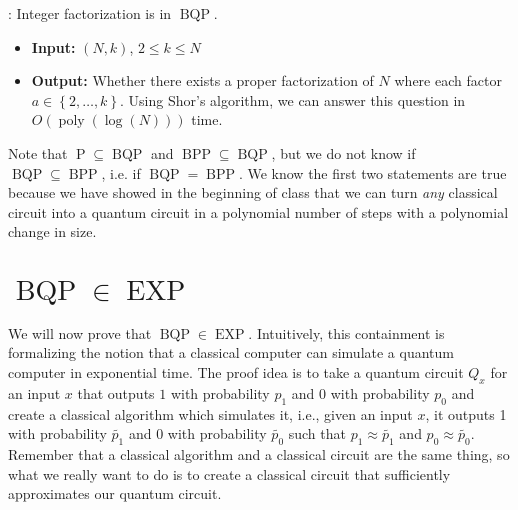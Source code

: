 \documentclass[11pt]{article}
\newcommand{\set}[1]{\left\{ #1 \right\}}
\newcommand{\poly}{\operatorname{poly}}
\newcommand{\bqp}{\operatorname{BQP}}
\newcommand{\bpp}{\operatorname{BPP}}
\newcommand{\p}{\operatorname{P}}
\renewcommand{\exp}{\operatorname{EXP}}
\newcommand{\Example}[1]{{\bf Example #1}:}
\def\fill{   \hfill}
\begin{document}
\fill

\noindent \Example{1} Integer factorization is in $\bqp$.
\begin{itemize}
\item {\bf Input:} $(N, k)$, $2 \leq k \leq N$
\item {\bf Output:} Whether there exists a proper factorization of $N$ where each factor $a \in \set{2, \dots, k}$. Using Shor's algorithm, we can answer this question in $O(\poly(\log(N)))$ time.
\end{itemize}

\fill

\noindent Note that $\p \subseteq \bqp$ and $\bpp \subseteq \bqp$, but we do not know if $\bqp \subseteq \bpp$, i.e. if $\bqp = \bpp$. We know the first two statements are true because we have showed in the beginning of class that we can turn \emph{any} classical circuit into a quantum circuit in a polynomial number of steps with a polynomial change in size. 

\section{$\bqp \in \exp$}
We will now prove that $\bqp \in \exp$. Intuitively, this containment is formalizing the notion that a classical computer can simulate a quantum computer in exponential time. The proof idea is to take a quantum circuit $Q_x$ for an input $x$ that outputs $1$ with probability $p_1$ and $0$ with probability $p_0$ and create a classical algorithm which simulates it, i.e., given an input $x$, it outputs 1 with probability $\widetilde{p_1}$ and 0 with probability $\widetilde{p_0}$ such that $p_1 \approx \widetilde{p_1}$ and $p_0 \approx \widetilde{p_0}$. Remember that a classical algorithm and a classical circuit are the same thing, so what we really want to do is to create a classical circuit that sufficiently approximates our quantum circuit.

\fill
\end{document}
